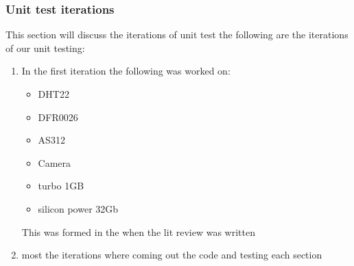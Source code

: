 \subsubsection{Unit test iterations}
This section will discuss the iterations of unit test the following are the iterations of  our unit testing:
\begin{enumerate}
    \item In the first iteration  the following was worked on:
    \begin{itemize}
        \item DHT22
        \item DFR0026
        \item AS312
        \item Camera
        \item turbo 1GB
        \item silicon power 32Gb
    \end{itemize}

    This was formed in the when the lit review was written
    \item most the iterations where coming out the code and testing  each section 
\end{enumerate}
